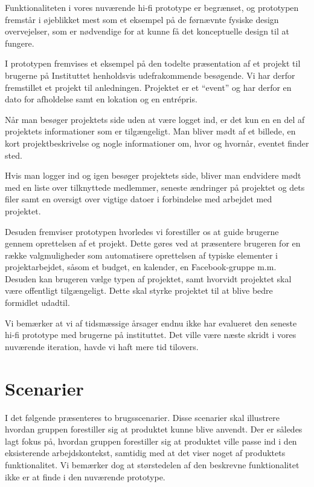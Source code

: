 Funktionaliteten i vores nuværende hi-fi prototype er begrænset, og prototypen fremstår i øjeblikket mest som et eksempel på de førnævnte fysiske design overvejelser, som er nødvendige for at kunne få det konceptuelle design til at fungere.

I prototypen fremvises et eksempel på den todelte præsentation af et projekt til brugerne på Instituttet henholdsvis udefrakommende besøgende. Vi har derfor fremstillet et projekt til anledningen. Projektet er et “event” og har derfor en dato for afholdelse samt en lokation og en entrépris.

Når man besøger projektets side uden at være logget ind, er det kun en en del af projektets informationer som er tilgængeligt. Man bliver mødt af et billede, en kort projektbeskrivelse og nogle informationer om, hvor og hvornår, eventet finder sted. 

Hvis man logger ind og igen besøger projektets side, bliver man endvidere mødt med en liste over tilknyttede medlemmer, seneste ændringer på projektet og dets filer samt en oversigt over vigtige datoer i forbindelse med arbejdet med projektet.

Desuden fremviser prototypen hvorledes vi forestiller os at guide brugerne gennem oprettelsen af et projekt. Dette gøres ved at præsentere brugeren for en række valgmuligheder som automatisere oprettelsen af typiske elementer i projektarbejdet, såsom et budget, en kalender, en Facebook-gruppe m.m. Desuden kan brugeren vælge typen af projektet, samt hvorvidt projektet skal være offentligt tilgængeligt. Dette skal styrke projektet til at blive bedre formidlet udadtil.

Vi bemærker at vi af tidsmæssige årsager endnu ikke har evalueret den seneste hi-fi prototype med brugerne på instituttet. Det ville være næste skridt i vores nuværende iteration, havde vi haft mere tid tilovers.

\section{Scenarier}
I det følgende præsenteres to brugsscenarier. Disse scenarier skal illustrere hvordan gruppen forestiller sig at produktet kunne blive anvendt. Der er således lagt fokus på, hvordan gruppen forestiller sig at produktet ville passe ind i den eksisterende arbejdskontekst, samtidig med at det viser noget af produktets funktionalitet. Vi bemærker dog at størstedelen af den beskrevne funktionalitet ikke er at finde i den nuværende prototype.

